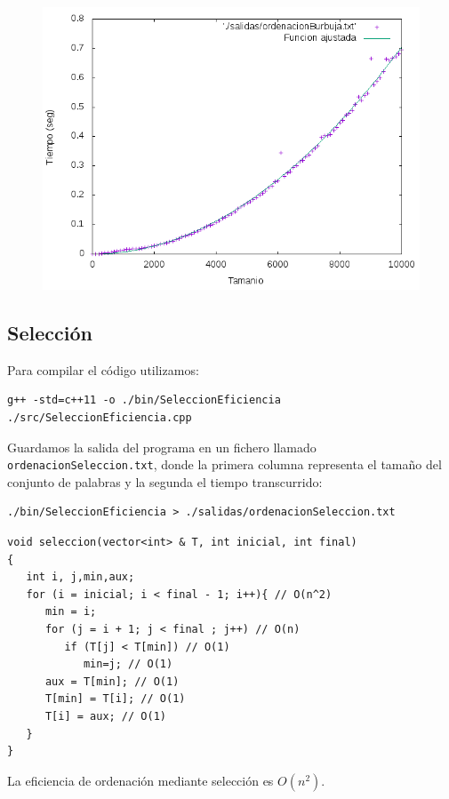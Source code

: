 \documentclass[11pt]{article}
\begin{document}
\begin{figure}[H]
\begin{center}
\includegraphics[width=12cm]{../salidas/ordenacionBurbuja.png}
\end{center}
\end{figure}

\subsection{Selección}

Para compilar el código utilizamos:
\begin{verbatim}
g++ -std=c++11 -o ./bin/SeleccionEficiencia ./src/SeleccionEficiencia.cpp 
\end{verbatim}

Guardamos la salida del programa en un fichero llamado \texttt{ordenacionSeleccion.txt}, donde la primera columna representa el tamaño del conjunto de palabras y la segunda el tiempo transcurrido:
\begin{verbatim}
./bin/SeleccionEficiencia > ./salidas/ordenacionSeleccion.txt
\end{verbatim}

\begin{verbatim}
void seleccion(vector<int> & T, int inicial, int final)
{
   int i, j,min,aux;
   for (i = inicial; i < final - 1; i++){ // O(n^2)
      min = i;
      for (j = i + 1; j < final ; j++) // O(n)
         if (T[j] < T[min]) // O(1)
            min=j; // O(1)
      aux = T[min]; // O(1)
      T[min] = T[i]; // O(1)
      T[i] = aux; // O(1)
   }
}
\end{verbatim}

La eficiencia de ordenación mediante selección es $O(n^2)$.
\end{document}
